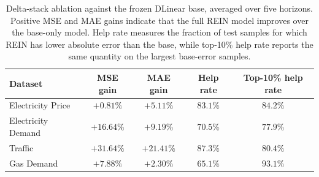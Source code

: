 \documentclass{article}
\begin{document}
\begin{table}[h]
\centering
\small
\setlength{\tabcolsep}{3pt}
\renewcommand{\arraystretch}{0.90}
\caption{
Delta-stack ablation against the frozen DLinear base, averaged over five horizons. Positive MSE and MAE gains indicate that the full REIN model improves over the base-only model. Help rate measures the fraction of test samples for which REIN has lower absolute error than the base, while top-10\% help rate reports the same quantity on the largest base-error samples.
}
\label{tab:delta_module_ablation}
\begin{tabular}{lcccc}
\toprule
\textbf{Dataset} & \textbf{MSE gain} & \textbf{MAE gain} & \textbf{Help rate} & \textbf{Top-10\% help rate} \\
\midrule
Electricity Price  & $+0.81\%$  & $+5.11\%$  & $83.1\%$ & $84.2\%$ \\
Electricity Demand & $+16.64\%$ & $+9.19\%$  & $70.5\%$ & $77.9\%$ \\
Traffic            & $+31.64\%$ & $+21.41\%$ & $87.3\%$ & $80.4\%$ \\
Gas Demand         & $+7.88\%$  & $+2.30\%$  & $65.1\%$ & $93.1\%$ \\
\bottomrule
\end{tabular}
\end{table}
\end{document}
